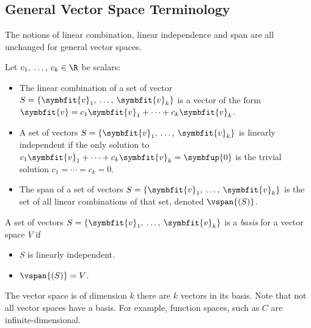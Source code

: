 \documentclass{article}
\begin{document}
\subsection{General Vector Space Terminology}
The notions of linear combination, linear independence and span are all unchanged for general vector spaces.

Let \(c_1,\: \dots,\: c_k \in \R\) be scalars:
\begin{itemize}
    \item The linear combination of a set of vector \(S = \left\{ \symbfit{v}_1,\: \dots,\: \symbfit{v}_k \right\}\)
          is a vector of the form \(\symbfit{v} = c_1 \symbfit{v}_1 + \cdots + c_k \symbfit{v}_k\).
    \item A set of vectors \(S = \left\{ \symbfit{v}_1,\: \dots,\: \symbfit{v}_k \right\}\) is linearly independent if
          the only solution to \(c_1 \symbfit{v}_1 + \cdots + c_k \symbfit{v}_k = \symbfup{0}\) is the trivial solution \(c_1 = \cdots = c_k = 0\).
    \item The span of a set of vectors \(S = \left\{ \symbfit{v}_1,\: \dots,\: \symbfit{v}_k \right\}\) is the set of all linear combinations of
          that set, denoted \(\vspan{\left( S \right)}\).
\end{itemize}
A set of vectors \(S = \left\{ \symbfit{v}_1,\: \dots,\: \symbfit{v}_k \right\}\) is a \textit{basis} for a vector space \(V\) if
\begin{itemize}
    \item \(S\) is linearly independent.
    \item \(\vspan{\left( S \right)} = V\).
\end{itemize}
The vector space is of dimension \(k\) there are \(k\) vectors in its basis. Note that not all vector spaces have a basis. For example, function spaces, such as \(C\)
are infinite-dimensional.
\end{document}
